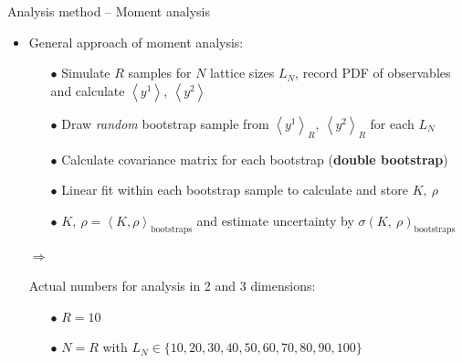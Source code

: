 \documentclass[xcolor=dvipsnames]{beamer}
\newcommand{\myitemsep}{\setlength\itemsep{0.33cm}}
\newcommand{\mysubitemsep}{\setlength\itemsep{0.22cm}}
\begin{document}
    \begin{frame}{Analysis method -- Moment analysis}
        \begin{itemize}
            \myitemsep
            \item {General approach of moment analysis:
                \begin{itemize}
                    \mysubitemsep
                    \item[$\bullet$] Simulate $R$ samples for $N$ lattice sizes $L_N$, record PDF of observables and
                                     calculate $\left\langle y^1 \right\rangle,\ \left\langle y^2 \right\rangle$
                    \item[$\bullet$] Draw \textit{random} bootstrap sample from $\left\langle y^1 \right\rangle_R,
                                     \ \left\langle y^2 \right\rangle_R$ for each $L_N$
                    \item[$\bullet$] Calculate covariance matrix for each bootstrap (\textbf{double bootstrap})
                    \item[$\bullet$] Linear fit within each bootstrap sample to calculate and store $K,\ \rho$
                    \item[$\bullet$] $K,\ \rho = \left\langle K, \rho \right\rangle_{\mathrm{bootstraps}}$ and estimate uncertainty by $\sigma (K,\ \rho)_{\mathrm{bootstraps}}$
                \end{itemize}
            }
            \item[$\Rightarrow$] {Actual numbers for analysis in 2 and 3 dimensions:
                \begin{itemize}
                    \mysubitemsep
                    \item[$\bullet$] $R = 10$
                    \item[$\bullet$] $N = R$ with $L_N \in \{10, 20, 30, 40, 50, 60, 70, 80, 90, 100\}$
                \end{itemize}
            }
        \end{itemize}
    \end{frame}
    
\end{document}
